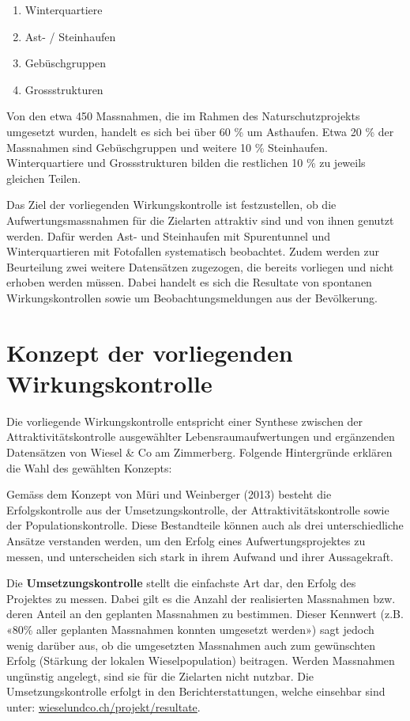 \documentclass[
]{scrbook}
\providecommand{\tightlist}{%
  \setlength{\itemsep}{0pt}\setlength{\parskip}{0pt}}
\begin{document}
\begin{enumerate}
\def\labelenumi{\arabic{enumi}.}
\tightlist
\item
  Winterquartiere
\item
  Ast- / Steinhaufen
\item
  Gebüschgruppen
\item
  Grossstrukturen
\end{enumerate}

Von den etwa 450 Massnahmen, die im Rahmen des Naturschutzprojekts umgesetzt wurden, handelt es sich bei über 60 \% um Asthaufen. Etwa 20 \% der Massnahmen sind Gebüschgruppen und weitere 10 \% Steinhaufen. Winterquartiere und Grossstrukturen bilden die restlichen 10 \% zu jeweils gleichen Teilen.

Das Ziel der vorliegenden Wirkungskontrolle ist festzustellen, ob die Aufwertungsmassnahmen für die Zielarten attraktiv sind und von ihnen genutzt werden. Dafür werden Ast- und Steinhaufen mit Spurentunnel und Winterquartieren mit Fotofallen systematisch beobachtet. Zudem werden zur Beurteilung zwei weitere Datensätzen zugezogen, die bereits vorliegen und nicht erhoben werden müssen. Dabei handelt es sich die Resultate von spontanen Wirkungskontrollen sowie um Beobachtungsmeldungen aus der Bevölkerung.

\hypertarget{konzept-der-vorliegenden-wirkungskontrolle}{%
\chapter{Konzept der vorliegenden Wirkungskontrolle}\label{konzept-der-vorliegenden-wirkungskontrolle}}

Die vorliegende Wirkungskontrolle entspricht einer Synthese zwischen der Attraktivitätskontrolle ausgewählter Lebensraumaufwertungen und ergänzenden Datensätzen von Wiesel \& Co am Zimmerberg. Folgende Hintergründe erklären die Wahl des gewählten Konzepts:

Gemäss dem Konzept von Müri und Weinberger (2013) besteht die Erfolgskontrolle aus der Umsetzungskontrolle, der Attraktivitätskontrolle sowie der Populationskontrolle. Diese Bestandteile können auch als drei unterschiedliche Ansätze verstanden werden, um den Erfolg eines Aufwertungsprojektes zu messen, und unterscheiden sich stark in ihrem Aufwand und ihrer Aussagekraft.

Die \textbf{Umsetzungskontrolle} stellt die einfachste Art dar, den Erfolg des Projektes zu messen. Dabei gilt es die Anzahl der realisierten Massnahmen bzw. deren Anteil an den geplanten Massnahmen zu bestimmen. Dieser Kennwert (z.B. «80\% aller geplanten Massnahmen konnten umgesetzt werden») sagt jedoch wenig darüber aus, ob die umgesetzten Massnahmen auch zum gewünschten Erfolg (Stärkung der lokalen Wieselpopulation) beitragen. Werden Massnahmen ungünstig angelegt, sind sie für die Zielarten nicht nutzbar. Die Umsetzungskontrolle erfolgt in den Berichterstattungen, welche einsehbar sind unter: \href{http://www.wieselundco.ch/projekt/resultate}{wieselundco.ch/projekt/resultate}.
\end{document}
